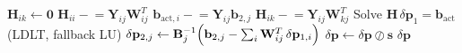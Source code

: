 \begin{algorithm}[H]
\begin{algorithmic}[1]
\EndFor
{}
  \State $\mathbf{H}_{ik} \gets \mathbf{0}$
\EndFor
{}
  \State $\mathbf{H}_{ii} \mathrel{-}= \mathbf{Y}_{ij}\mathbf{W}_{ij}^T$
  \State $\mathbf{b}_{\mathrm{act},i} \mathrel{-}= \mathbf{Y}_{ij}\mathbf{b}_{2,j}$
    \State $\mathbf{H}_{ik} \mathrel{-}= \mathbf{Y}_{ij}\mathbf{W}_{kj}^T$
  \EndFor
\EndFor
\State Solve $\mathbf{H}\,\delta\mathbf{p}_1 = \mathbf{b}_{\mathrm{act}}$ (LDLT, fallback LU)
  \State $\delta\mathbf{p}_{2,j} \gets \mathbf{B}^{-1}_{j}\Bigl(\mathbf{b}_{2,j}-\sum_{i}\mathbf{W}_{ij}^{T}\,\delta\mathbf{p}_{1,i}\Bigr)$
\EndFor
\State $\delta\mathbf{p} \gets \delta\mathbf{p} \oslash \mathbf{s}$ %
\State \Return $\delta\mathbf{p}$
\end{algorithmic}
\end{algorithm}


